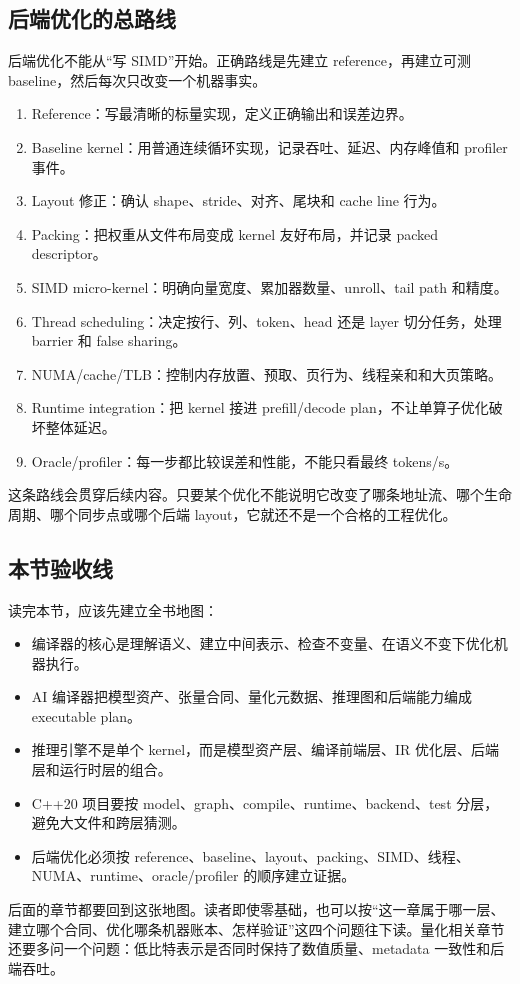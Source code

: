 \subsection{后端优化的总路线}

后端优化不能从“写 SIMD”开始。正确路线是先建立 reference，再建立可测 baseline，然后每次只改变一个机器事实。

\begin{enumerate}
  \item Reference：写最清晰的标量实现，定义正确输出和误差边界。
  \item Baseline kernel：用普通连续循环实现，记录吞吐、延迟、内存峰值和 profiler 事件。
  \item Layout 修正：确认 shape、stride、对齐、尾块和 cache line 行为。
  \item Packing：把权重从文件布局变成 kernel 友好布局，并记录 packed descriptor。
  \item SIMD micro-kernel：明确向量宽度、累加器数量、unroll、tail path 和精度。
  \item Thread scheduling：决定按行、列、token、head 还是 layer 切分任务，处理 barrier 和 false sharing。
  \item NUMA/cache/TLB：控制内存放置、预取、页行为、线程亲和和大页策略。
  \item Runtime integration：把 kernel 接进 prefill/decode plan，不让单算子优化破坏整体延迟。
  \item Oracle/profiler：每一步都比较误差和性能，不能只看最终 tokens/s。
\end{enumerate}

这条路线会贯穿后续内容。只要某个优化不能说明它改变了哪条地址流、哪个生命周期、哪个同步点或哪个后端 layout，它就还不是一个合格的工程优化。

\subsection{本节验收线}

读完本节，应该先建立全书地图：

\begin{itemize}
  \item 编译器的核心是理解语义、建立中间表示、检查不变量、在语义不变下优化机器执行。
  \item AI 编译器把模型资产、张量合同、量化元数据、推理图和后端能力编成 executable plan。
  \item 推理引擎不是单个 kernel，而是模型资产层、编译前端层、IR 优化层、后端层和运行时层的组合。
  \item C++20 项目要按 model、graph、compile、runtime、backend、test 分层，避免大文件和跨层猜测。
  \item 后端优化必须按 reference、baseline、layout、packing、SIMD、线程、NUMA、runtime、oracle/profiler 的顺序建立证据。
\end{itemize}

后面的章节都要回到这张地图。读者即使零基础，也可以按“这一章属于哪一层、建立哪个合同、优化哪条机器账本、怎样验证”这四个问题往下读。量化相关章节还要多问一个问题：低比特表示是否同时保持了数值质量、metadata 一致性和后端吞吐。
